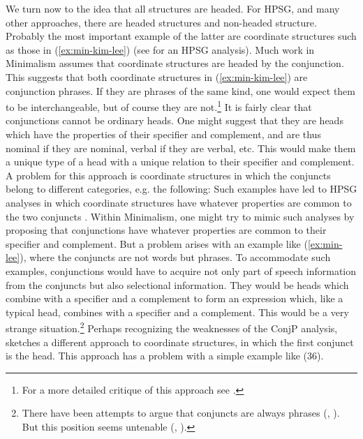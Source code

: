 \documentclass[output=paper]{langsci/langscibook}
\begin{document}
We turn now to the idea that all structures are headed. For HPSG, and many other approaches, there are headed structures and non-headed structure. Probably the most important example of the latter are coordinate structures such as those in (\ref{ex:min-kim-lee}) (see \citealt{Sag.2003} for an HPSG analysis).
\label{ex:min-kim-lee}
\z
Much work in Minimalism assumes that coordinate structures are headed by the conjunction. This suggests that both coordinate structures in (\ref{ex:min-kim-lee}) are conjunction phrases. If they are phrases of the same kind, one would expect them to be interchangeable, but of course they are not.\footnote{%
	For a more detailed critique of this approach see \citet{Borsley2005a}.%
}
\label{ex:min-sang-dance}
\z
It is fairly clear that conjunctions cannot be ordinary heads. One might suggest that they are heads which have the properties of their specifier and complement, and are thus nominal if they are nominal, verbal if they are verbal, etc. This would make them a unique type of a head with a unique relation to their specifier and complement. A problem for this approach is coordinate structures in which the conjuncts belong to different categories, e.g. the following:
\eal
{}\label{ex:min-hobbs-linguist}
\label{ex:min-hobbs-angry}
\zl 
Such examples have led to HPSG analyses in which coordinate structures have whatever properties are common to the two conjuncts \citep{Sag.2003}. Within Minimalism, one might try to mimic such analyses by proposing that conjunctions have whatever properties are common to their specifier and complement. But a problem arises with an example like (\ref{ex:min-lee}), where the conjuncts are not words but phrases.
\label{ex:min-kim-criticized}
\z
To accommodate such examples, conjunctions would have to acquire not only part of speech information from the conjuncts but also selectional information. They would be heads which combine with a specifier and a complement to form an expression which, like a typical head, combines with a specifier and a complement. This would be a very strange situation.\footnote{%
	There have been attempts to argue that conjuncts are always phrases (\citealt{Kayne94a-u}, \citealt{Bruening2018a}). But this position seems untenable (\citealt{Abeille2006a}, \citealt{MuellerLexicalism}).%
}
Perhaps recognizing the weaknesses of the ConjP analysis, \citet{Chomsky2013a} sketches a different approach to coordinate structures, in which the first conjunct is the head. This approach has a problem with a simple example like (36).
\end{document}
